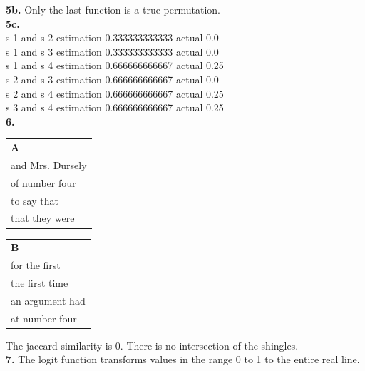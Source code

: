\documentclass[10pt]{amsart}
\def\wl{\par \vspace{\baselineskip}}
\begin{document}
\textbf{5b.} Only the last function is a true permutation. \\

\textbf{5c.} \\

s 1 and s 2 estimation 0.333333333333 actual 0.0 \\
s 1 and s 3 estimation 0.333333333333 actual 0.0 \\
s 1 and s 4 estimation 0.666666666667 actual 0.25 \\
s 2 and s 3 estimation 0.666666666667 actual 0.0  \\
s 2 and s 4 estimation 0.666666666667 actual 0.25 \\
s 3 and s 4 estimation 0.666666666667 actual 0.25 \\

\textbf{6.} \\

\begin{tabular}{l}
  \textbf{A} \\


  and Mrs. Dursely \\
  of number four\\
  to say that \\
  that they were \\

\end{tabular}

\begin{tabular}{l}
  \textbf{B} \\


  for the first \\
  the first time \\
  an argument had \\
  at number four \\

\end{tabular}

\wl

The jaccard similarity is 0. There is no intersection of the shingles. \\

\textbf{7.} The logit function transforms values in the range 0 to 1 to the
entire real line.
\end{document}
